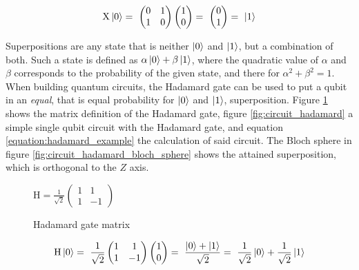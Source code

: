 \begin{equation}
    \centering
    \begin{split}
        \mathrm{X}\ket{0} =\ \begin{pmatrix} 0 & 1 \\ 1 & 0 \end{pmatrix}\begin{pmatrix}1 \\ 0\end{pmatrix} =\ \begin{pmatrix}0 \\ 1\end{pmatrix} =\ \ket{1}
    \end{split}
    \label{equation:pauli_x_example}
\end{equation}

Superpositions are any state that is neither $\ket{0}$ and $\ket{1}$, but a combination of both. Such a state is defined as $\alpha\ket{0} + \beta\ket{1}$, where the quadratic value of $\alpha$ and $\beta$ corresponds to the probability of the given state, and there for $\alpha^2 + \beta^2 = 1$. When building quantum circuits, the Hadamard\cite{qiskit_hgate_nodate} gate can be used to put a qubit in an \emph{equal}, that is equal probability for $\ket{0}$ and $\ket{1}$, superposition. Figure \ref{fig:matrix_hadamard} shows the matrix definition of the Hadamard gate, figure \ref{fig:circuit_hadamard} a simple single qubit circuit with the Hadamard gate, and equation \ref{equation:hadamard_example} the calculation of said circuit. The Bloch sphere in figure \ref{fig:circuit_hadamard_bloch_sphere} shows the attained superposition, which is orthogonal to the $Z$ axis.

\begin{figure}[!h]
    \centering
    $\mathrm{H} = \frac{1}{\sqrt{2}}\begin{pmatrix}1 & 1 \\1 & -1\end{pmatrix}$
    \caption{Hadamard gate matrix}
    \label{fig:matrix_hadamard}
\end{figure}

\begin{equation}
    \centering
    \begin{split}
        \mathrm{H}\ket{0} =\ \frac{1}{\sqrt{2}}\begin{pmatrix}1 & 1 \\1 & -1\end{pmatrix}\begin{pmatrix}1 \\ 0\end{pmatrix} =\ \frac{\ket{0} + \ket{1}}{\sqrt{2}} =\ \frac{1}{\sqrt{2}}\ket{0} + \frac{1}{\sqrt{2}}\ket{1}
    \end{split}
    \label{equation:hadamard_example}
\end{equation}


